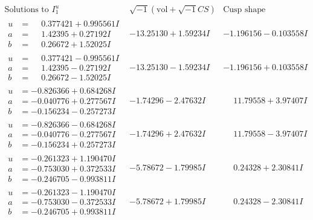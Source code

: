 \documentclass[1p]{elsarticle_modified}
\theoremstyle{definition}
\newcommand{\I}{\sqrt{-1}}
\begin{document}
$$\begin{array}{c|c|c}  
\text{Solutions to }I^u_{1}& \I (\text{vol} + \sqrt{-1}CS) & \text{Cusp shape}\\
 \hline 
\begin{aligned}
u &= \phantom{-}0.377421 + 0.995561 I \\
a &= \phantom{-}1.42395 + 0.27192 I \\
b &= \phantom{-}0.26672 + 1.52025 I\end{aligned}
 & -13.25130 + 1.59234 I & -1.196156 - 0.103558 I \\ \hline\begin{aligned}
u &= \phantom{-}0.377421 - 0.995561 I \\
a &= \phantom{-}1.42395 - 0.27192 I \\
b &= \phantom{-}0.26672 - 1.52025 I\end{aligned}
 & -13.25130 - 1.59234 I & -1.196156 + 0.103558 I \\ \hline\begin{aligned}
u &= -0.826366 + 0.684268 I \\
a &= -0.040776 + 0.277567 I \\
b &= -0.156234 - 0.257273 I\end{aligned}
 & -1.74296 - 2.47632 I & \phantom{-}11.79558 + 3.97407 I \\ \hline\begin{aligned}
u &= -0.826366 - 0.684268 I \\
a &= -0.040776 - 0.277567 I \\
b &= -0.156234 + 0.257273 I\end{aligned}
 & -1.74296 + 2.47632 I & \phantom{-}11.79558 - 3.97407 I \\ \hline\begin{aligned}
u &= -0.261323 + 1.190470 I \\
a &= -0.753030 + 0.372533 I \\
b &= -0.246705 - 0.993811 I\end{aligned}
 & -5.78672 - 1.79985 I & \phantom{-}0.24328 + 2.30841 I \\ \hline\begin{aligned}
u &= -0.261323 - 1.190470 I \\
a &= -0.753030 - 0.372533 I \\
b &= -0.246705 + 0.993811 I\end{aligned}
 & -5.78672 + 1.79985 I & \phantom{-}0.24328 - 2.30841 I \\ \hline\begin{aligned}

\end{aligned}
\end{array}$$
\end{document}
